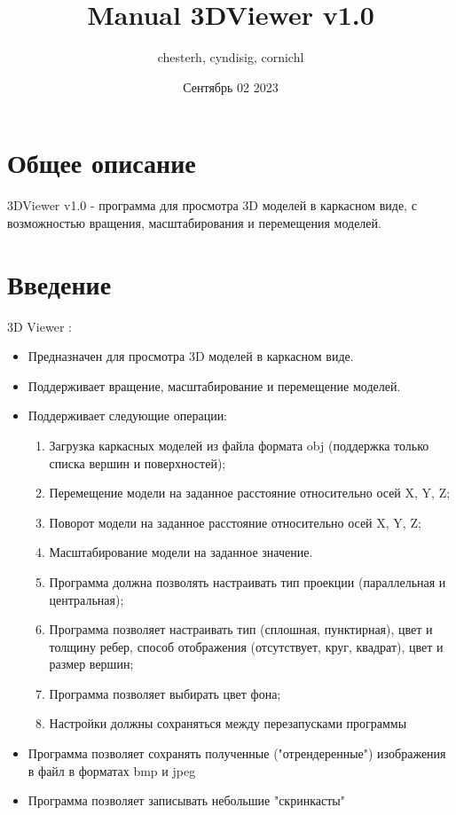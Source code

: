 \documentclass[12pt, a4paper]{article}
\title{Manual 3DViewer v1.0}
\author{chesterh, cyndisig, cornichl}
\date{Сентябрь 02 2023}
\begin{document}
\maketitle

\pagebreak

\tableofcontents

\pagebreak

\section{Общее описание}

3DViewer v1.0 - программа для просмотра 3D моделей в каркасном виде, с возможностью вращения, масштабирования и перемещения моделей.

\pagebreak

\section{Введение}
3D Viewer :
    \begin{itemize}
        \item Предназначен для просмотра 3D моделей в каркасном виде.
        \item Поддерживает вращение, масштабирование и перемещение моделей.
        \item Поддерживает следующие операции:
        \begin{enumerate}
            \item Загрузка каркасных моделей из файла формата obj (поддержка только списка вершин и поверхностей);
            \item Перемещение модели на заданное расстояние относительно осей X, Y, Z;
            \item Поворот модели на заданное расстояние относительно осей X, Y, Z;
            \item Масштабирование модели на заданное значение.
            \item Программа должна позволять настраивать тип проекции (параллельная и центральная);
            \item Программа позволяет настраивать тип (сплошная, пунктирная), цвет и толщину ребер, способ отображения (отсутствует, круг, квадрат), цвет и размер вершин;
            \item Программа позволяет выбирать цвет фона;
            \item Настройки должны сохраняться между перезапусками программы
        \end{enumerate}
        \item Программа позволяет сохранять полученные ("отрендеренные") изображения в файл в форматах bmp и jpeg
        \item Программа позволяет записывать небольшие "скринкасты" 
    \end{itemize}
\end{document}
